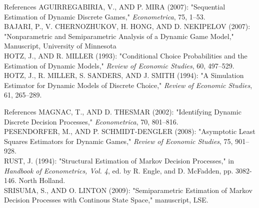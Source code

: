 \documentclass[xcolor=pdftex,dvipsnames,table,mathserif]{beamer}
\begin{document}
\begin{frame}{References}
AGUIRREGABIRIA, V., AND P. MIRA (2007): "Sequential Estimation of Dynamic Discrete Games," \emph{Econometrica}, 75, 1--53. \\
\vspace{2mm}
BAJARI, P., V. CHERNOZHUKOV, H. HONG, AND D. NEKIPELOV (2007): "Nonparametric and Semiparametric Analysis of a Dynamic Game Model," Manuscript, University of Minnesota \\
\vspace{2mm}
HOTZ, J., AND R. MILLER (1993): "Conditional Choice Probabilities and the Estimation of Dynamic Models," \emph{Review of Economic Studies}, 60, 497--529. \\
\vspace{2mm}
HOTZ, J., R. MILLER, S. SANDERS, AND J. SMITH (1994): "A Simulation Estimator for Dynamic Models of Discrete Choice," \emph{Review of Economic Studies}, 61, 265--289.\\
\end{frame}

\begin{frame}{References}
MAGNAC, T., AND D. THESMAR (2002): "Identifying Dynamic Discrete Decision Processes," \emph{Econometrica}, 70, 801--816.\\
\vspace{2mm}
PESENDORFER, M., AND P. SCHMIDT-DENGLER (2008): "Asymptotic Least Squares Estimators for Dynamic Games," \emph{Review of Economic Studies}, 75, 901--928. \\
\vspace{2mm}
RUST, J. (1994): "Structural Estimation of Markov Decision Processes," in \emph{Handbook of Econometrics, Vol. 4}, ed. by R. Engle, and D. McFadden, pp. 3082-146. North Holland.\\
\vspace{2mm}
SRISUMA, S., AND O. LINTON (2009): "Semiparametric Estimation of Markov Decision Processes with Continous State Space," manuscript, LSE. 
\end{frame}
\end{document}
